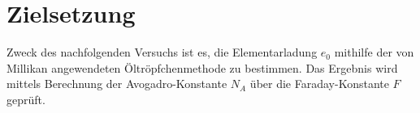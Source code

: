 \section{Zielsetzung}
\label{sec:zielsetzung}

Zweck des nachfolgenden Versuchs ist es, die Elementarladung $e_0$ mithilfe der von Millikan angewendeten Öltröpfchenmethode zu bestimmen.
Das Ergebnis wird mittels Berechnung der Avogadro-Konstante $N_{\! A}$ über die Faraday-Konstante $F$ geprüft.
